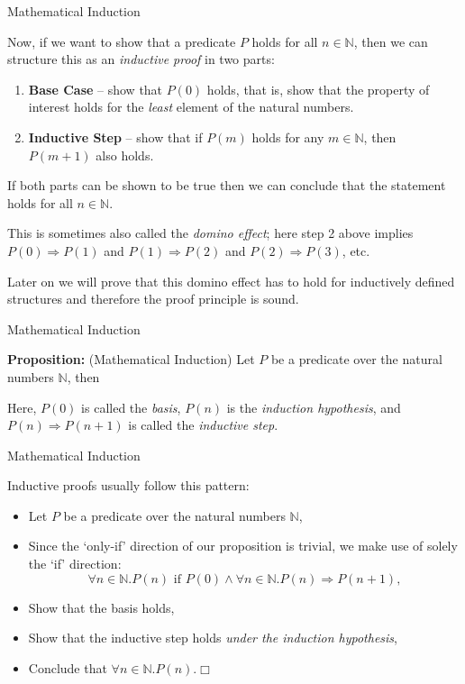\documentclass{beamer}
\begin{document}
\begin{frame}{Mathematical Induction}

\small
Now, if we want to show that a predicate $P$ holds for all $n\in\mathbb{N}$, then
we can structure this as an {\em inductive proof} in two parts:
\begin{enumerate}
\item {\bf Base Case} -- show that $P(0)$ holds, that is, show that the property of interest holds for the {\em least} element of the natural numbers.
\item {\bf Inductive Step} -- show that if $P(m)$ holds for any $m\in\mathbb{N}$,
then $P(m+1)$ also holds.
\end{enumerate}
If both parts can be shown to be true then we can conclude that the statement holds for all $n\in\mathbb{N}$.

\vspace{.1in}

This is sometimes also called the {\em domino effect};  here step 2 above implies $P(0) \Rightarrow P(1)$
and $P(1) \Rightarrow P(2)$ and $P(2) \Rightarrow P(3)$, etc.

\vspace{.1in}
Later on we will prove that this domino effect has to hold for inductively defined structures and therefore
the proof principle is sound.

\end{frame}


\begin{frame}{Mathematical Induction}


{\bf Proposition:} (Mathematical Induction) Let $P$ be a predicate over the
natural numbers $\mathbb{N}$, then

Here, $P(0)$ is called the {\em basis}, $P(n)$ is the {\em induction hypothesis}, and $P(n) \Rightarrow P(n+1)$ is called the {\em inductive step}.
\vspace{.2in}
\end{frame}

\begin{frame}{Mathematical Induction}

Inductive proofs usually follow this pattern: 

\begin{itemize}
\item Let $P$ be a predicate over the natural numbers $\mathbb{N}$,

\item Since the `only-if' direction of our proposition is trivial, we make use of solely the `if' direction:
\[
\forall n \in \mathbb{N}. P(n) \mbox{ if } P(0) \wedge  \forall n\in \mathbb{N}.P(n) \Rightarrow P(n+1),
\]
\item Show that the basis holds,
\item Show that the inductive step holds
{\em under the induction hypothesis},
\item Conclude that $\forall n \in \mathbb{N}. P(n). \Box$
\end{itemize}

\end{frame}
\end{document}
